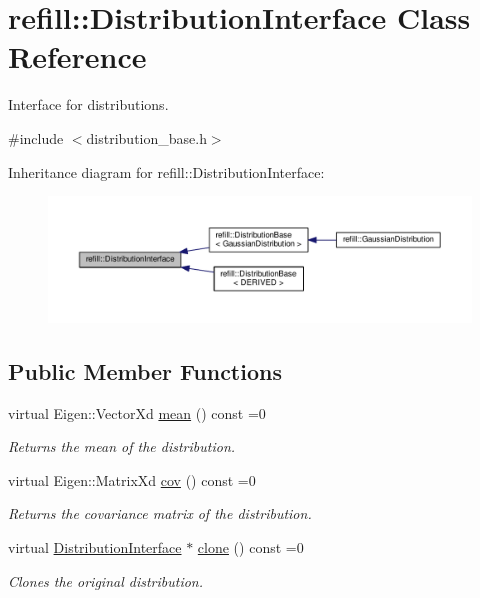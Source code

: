 \hypertarget{classrefill_1_1DistributionInterface}{}\section{refill\+:\+:Distribution\+Interface Class Reference}
\label{classrefill_1_1DistributionInterface}


Interface for distributions.  




{\ttfamily \#include $<$distribution\+\_\+base.\+h$>$}



Inheritance diagram for refill\+:\+:Distribution\+Interface\+:\nopagebreak
\begin{figure}[H]
\begin{center}
\leavevmode
\includegraphics[width=350pt]{classrefill_1_1DistributionInterface__inherit__graph}
\end{center}
\end{figure}
\subsection*{Public Member Functions}
\begin{DoxyCompactItemize}
\item 
virtual Eigen\+::\+Vector\+Xd \hyperlink{classrefill_1_1DistributionInterface_a040f74b619ff493250e43699d7f88a5b}{mean} () const =0
\begin{DoxyCompactList}\small\item\em Returns the mean of the distribution. \end{DoxyCompactList}\item 
virtual Eigen\+::\+Matrix\+Xd \hyperlink{classrefill_1_1DistributionInterface_a88cd04a3fd67fa1702e243087c8dffa3}{cov} () const =0
\begin{DoxyCompactList}\small\item\em Returns the covariance matrix of the distribution. \end{DoxyCompactList}\item 
virtual \hyperlink{classrefill_1_1DistributionInterface}{Distribution\+Interface} $\ast$ \hyperlink{classrefill_1_1DistributionInterface_addb2d3052afd3cf114a94a3f097fae80}{clone} () const =0
\begin{DoxyCompactList}\small\item\em Clones the original distribution. \end{DoxyCompactList}\end{DoxyCompactItemize}


